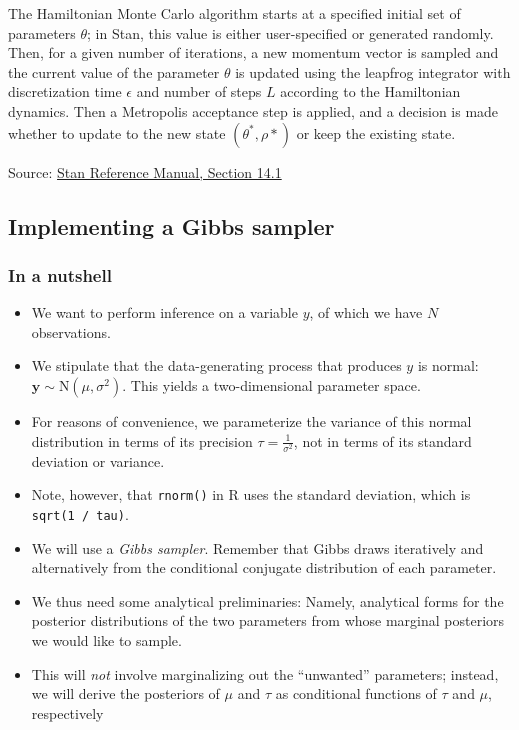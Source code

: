 \documentclass[
  11pt,
]{article}
\providecommand{\tightlist}{%
  \setlength{\itemsep}{0pt}\setlength{\parskip}{0pt}}
\begin{document}
The Hamiltonian Monte Carlo algorithm starts at a specified initial set of parameters \(\theta\); in Stan, this value is either user-specified or generated randomly. Then, for a given number of iterations, a new momentum vector is sampled and the current value of the parameter \(\theta\) is updated using the leapfrog integrator with discretization time \(\epsilon\) and number of steps \(L\) according to the Hamiltonian dynamics. Then a Metropolis acceptance step is applied, and a decision is made whether to update to the new state \((\theta^{\ast},\rho{\ast})\) or keep the existing state.

Source: \href{https://mc-stan.org/docs/2_19/reference-manual/hamiltonian-monte-carlo.html}{Stan Reference Manual, Section 14.1}

\hypertarget{implementing-a-gibbs-sampler}{%
\subsection{Implementing a Gibbs sampler}\label{implementing-a-gibbs-sampler}}

\hypertarget{in-a-nutshell}{%
\subsubsection{In a nutshell}\label{in-a-nutshell}}

\begin{itemize}
\tightlist
\item
  We want to perform inference on a variable \(y\), of which we have \(N\) observations.
\item
  We stipulate that the data-generating process that produces \(y\) is normal: \(\mathbf{y} \sim \text{N}(\mu, \sigma^2)\). This yields a two-dimensional parameter space.
\item
  For reasons of convenience, we parameterize the variance of this normal distribution in terms of its precision \(\tau = \frac{1}{\sigma^2}\), not in terms of its standard deviation or variance.
\item
  Note, however, that \texttt{rnorm()} in R uses the standard deviation, which is \texttt{sqrt(1\ /\ tau)}.
\item
  We will use a \emph{Gibbs sampler}. Remember that Gibbs draws iteratively and alternatively from the conditional conjugate distribution of each parameter.
\item
  We thus need some analytical preliminaries: Namely, analytical forms for the posterior distributions of the two parameters from whose marginal posteriors we would like to sample.
\item
  This will \emph{not} involve marginalizing out the ``unwanted'' parameters; instead, we will derive the posteriors of \(\mu\) and \(\tau\) as conditional functions of \(\tau\) and \(\mu\), respectively
\end{itemize}
\end{document}
